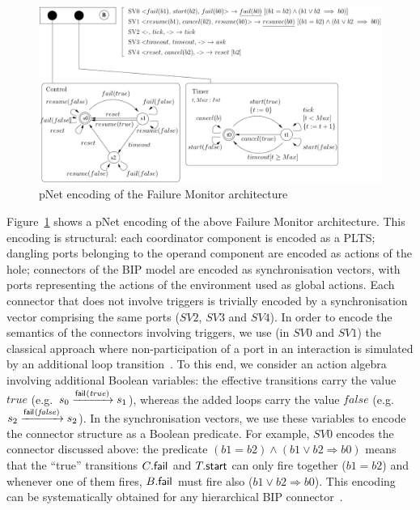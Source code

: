 \documentclass[smallcondensed]{svjour3}
\newcommand{\noteEM}[2][color=blue!40, size=\tiny]{\todo[#1]{{\bf Eric: } {#2}}}
\newcommand{\eg}[1][\ ]{e.g.#1}
\newcommand{\goesto}[2][]{\ensuremath{\xrightarrow[#1]{#2}}}
\newcommand{\true}{\ensuremath{\mathit{true}}}
\newcommand{\false}{\ensuremath{\mathit{false}}}
\begin{document}
\begin{figure}[t]
  \centering
  \includegraphics[width=0.9\columnwidth]{ActaXFIG/FailureTimerPNET-v2-2}
  \caption{pNet encoding of the Failure Monitor architecture}
  \label{schema:ArchFailure:pNet}
\end{figure}

Figure~\ref{schema:ArchFailure:pNet} shows a pNet encoding of the
above Failure Monitor architecture.  This encoding is structural: each
coordinator component is encoded as a PLTS; dangling ports belonging
to the operand component are encoded as actions of the hole; 
connectors of the BIP model are encoded as synchronisation vectors,
with ports
  representing the actions of the environment used as global actions.
Each connector that does not involve triggers is trivially encoded by
a synchronisation vector comprising the same ports ($SV2$, $SV3$ and
$SV4$).  In order to encode the semantics of the connectors involving
triggers, we use (in $SV0$ and $SV1$) the classical approach where
non-participation of a port in an interaction is simulated by an
additional loop transition~\cite{milner83-calculi}.  To this end, we
consider an action algebra involving additional Boolean variables: the
effective transitions carry the value $\true$ (\eg $\cstate{0}
\goesto{\PortFail(\true)} \cstate{1}$), whereas the added loops carry
the value $\false$ (\eg $\cstate{2} \goesto{\PortFail(\false)}
\cstate{2}$).  In the synchronisation vectors, we use these variables
to encode the connector structure as a Boolean predicate.  For
example, $SV0$ encodes the connector discussed above: the predicate
$(b1=b2) \land (b1\lor b2 \Rightarrow b0)$ means that the ``true''
transitions $C_{}.\mathsf{fail}_{}$ and $T_{}.\mathsf{start}$ can only
fire together ($b1 = b2$) and whenever one of them fires,
$B.\mathsf{fail}_{}$ must fire also ($b1 \lor b2 \Rightarrow b0$).
This encoding can be systematically obtained for any hierarchical BIP
connector~\cite{BliSif10-causal-fmsd}.
%
\end{document}

